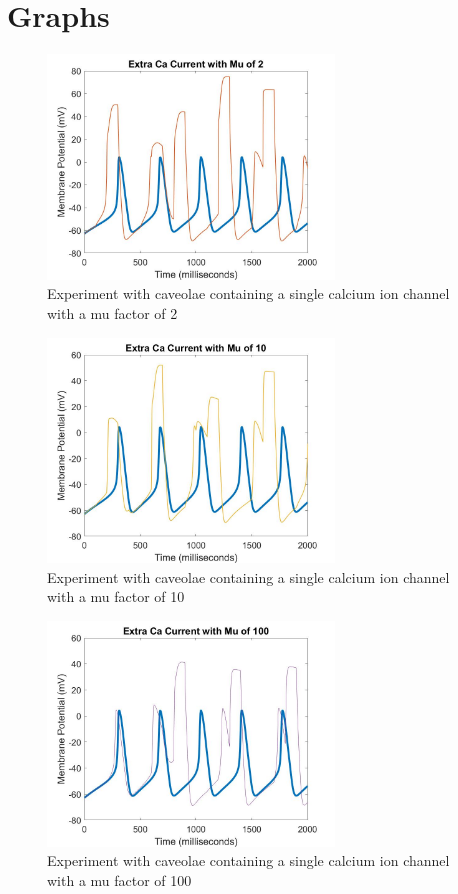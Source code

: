 \documentclass{bmcart}%
\begin{document}
\section*{Graphs}

\begin{figure}[ht]
  \includegraphics[width=3in]{images/CaMu2}
  \caption[CacliumMu2]
  {Experiment with caveolae containing a single calcium ion channel\\
  with a mu factor of 2}
\label{fig:CaMu2}
\end{figure}

\begin{figure}[ht]
  \centering
  \includegraphics[width=3in]{images/CaMu10}
  \caption[CacliumMu10]
  {Experiment with caveolae containing a single calcium ion channel\\
  with a mu factor of 10}
\label{fig:CaMu10}
\end{figure}

\begin{figure}[ht]
  \centering
  \includegraphics[width=3in]{images/CaMu100}
  \caption[CacliumMu100]
  {Experiment with caveolae containing a single calcium ion channel\\ 
  with a mu factor of 100}
\label{fig:CaMu100}
\end{figure}
\end{document}
